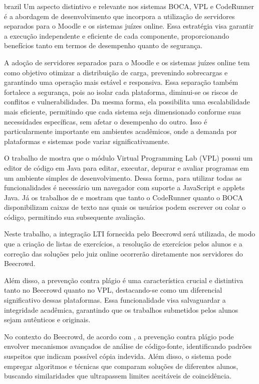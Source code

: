 \begin{otherlanguage*}{brazil}
Um aspecto distintivo e relevante nos sistemas BOCA, VPL e CodeRunner é a abordagem de desenvolvimento que incorpora a utilização de servidores separados para o Moodle e os sistemas juízes online. Essa estratégia visa garantir a execução independente e eficiente de cada componente, proporcionando benefícios tanto em termos de desempenho quanto de segurança.

A adoção de servidores separados para o Moodle e os sistemas juízes online tem como objetivo otimizar a distribuição de carga, prevenindo sobrecargas e garantindo uma operação mais estável e responsiva. Essa separação também fortalece a segurança, pois ao isolar cada plataforma, diminui-se os riscos de conflitos e vulnerabilidades. Da mesma forma, ela possibilita uma escalabilidade mais eficiente, permitindo que cada sistema seja dimensionado conforme suas necessidades específicas, sem afetar o desempenho do outro. Isso é particularmente importante em ambientes acadêmicos, onde a demanda por plataformas e sistemas pode variar significativamente.

O trabalho de \textcite{rodriguezdelpinoandroyo} mostra que o módulo Virtual Programming Lab (VPL) possui um editor de código em Java para editar, executar, depurar e avaliar programas em um ambiente simples de desenvolvimento. Dessa forma, para utilizar todas as funcionalidades é necessário um navegador com suporte a JavaScript e applets Java. Já os trabalhos de \textcite{lobbharlow} e \textcite{galasso} mostram que tanto o CodeRunner quanto o BOCA disponibilizam caixas de texto nas quais os usuários podem escrever ou colar o código, permitindo sua subsequente avaliação.

Neste trabalho, a integração LTI fornecida pelo Beecrowd será utilizada, de modo que a criação de listas de exercícios, a resolução de exercícios pelos alunos e a correção das soluções pelo juiz online ocorrerão diretamente nos servidores do Beecrowd.

Além disso, a prevenção contra plágio é uma característica crucial e distintiva tanto no Beecrowd quanto no VPL, destacando-se como um diferencial significativo dessas plataformas. Essa funcionalidade visa salvaguardar a integridade acadêmica, garantindo que os trabalhos submetidos pelos alunos sejam autênticos e originais.

No contexto do Beecrowd, de acordo com \cite{cruz2022}, a prevenção contra plágio pode envolver mecanismos avançados de análise de código-fonte, identificando padrões suspeitos que indicam possível cópia indevida. Além disso, o sistema pode empregar algoritmos e técnicas que comparam soluções de diferentes alunos, buscando similaridades que ultrapassem limites aceitáveis de coincidência.


\end{otherlanguage*}
